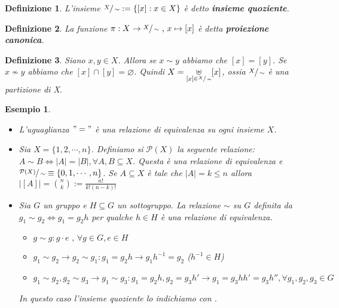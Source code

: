 \documentclass[a4paper,12pt]{article}
\theoremstyle{def}
\newtheorem*{definition}{Definizione}
\theoremstyle{prop}
\theoremstyle{esempio}
\newtheorem*{example}{Esempio}
\theoremstyle{dimostrazione}
\theoremstyle{teo}
\theoremstyle{osservazione}
\begin{document}
\begin{definition}
	L'insieme \(\sfrac{X}{\sim} := \{[x] : x \in X\}\) è detto \textbf{insieme quoziente}.
\end{definition}

\begin{definition}
	La funzione \begin{math}
		\pi : X \rightarrow \sfrac{X}{\sim} \text{ , } x \mapsto [x] \end{math} è detta \textbf{proiezione canonica}.
\end{definition}

\begin{definition}
	Siano \(x,y \in X\). Allora se \(x \sim y\) abbiamo che \([x] = [y]\).
	Se \(x \nsim y\) abbiamo che \([x] \cap [y] = \varnothing\).
	Quindi \(X = \underset{[x] \in \sfrac{X}{\sim}}{\uplus} [x]\), ossia \(\sfrac{X}{\sim}\) è una partizione di X.
\end{definition}

\begin{example}
	\
	\begin{itemize}
		\item L'uguaglianza \("="\) è una relazione di equivalenza
		      su ogni insieme \(X\).
		\item Sia \(X = \{1,2,\cdots,n\}\). Definiamo si \(\mathcal{P}(X)\)
		      la seguente relazione:
		      \(A \sim B \Leftrightarrow |A| = |B|, \forall A,B \subseteq X\).
		      Questa è una relazione di equivalenza e \(\sfrac{\mathcal{P}(X)}{\sim}
		      \equiv \{0,1,\cdots,n\}\). Se \(A \subseteq X\) è tale che
		      \(|A| = k \leq n\) allora \(|[A]| = \binom{n}{k} := \frac{n!}{k!(n-k)!}\)
		\item Sia \(G\) un gruppo e \(H \subseteq G\) un sottogruppo. La relazione
		      \(\sim \) su \(G\) definita da \(g_1 \sim g_2 \Leftrightarrow g_1=g_2 h\)
		      per qualche \(h \in H\) è una relazione di equivalenza.\
		      \begin{itemize}
			      \item \(g \sim g : g \cdot e \text{ , } \forall g \in G , e \in H\)
			      \item \(g_1 \sim g_2 \rightarrow g_2 \sim g_1 : g_1 = g_2 h \rightarrow
			            g_1 h^{-1} = g_2\) (\(h^{-1} \in H\))
			      \item \(g_1 \sim g_2 , g_2 \sim g_3 \rightarrow g_1 \sim g_3 :
			            g_1 = g_2 h, g_2 = g_3 h' \rightarrow g_1 = g_3 h h' = g_3 h''
			            , \forall g_1,g_2,g_3 \in G\)
		      \end{itemize}
		      In questo caso l'insieme quoziente lo indichiamo con .

	\end{itemize}
\end{example}
\end{document}
